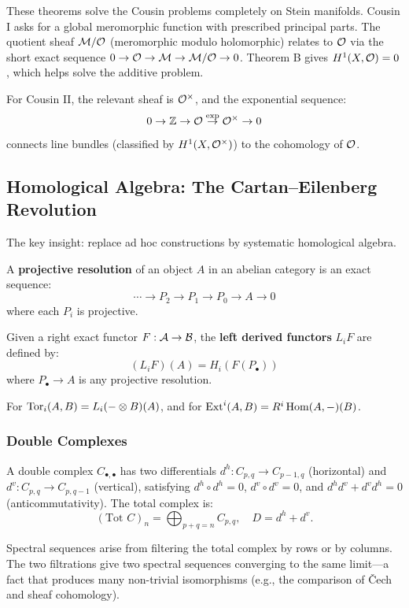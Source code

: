 These theorems solve the Cousin problems completely on Stein manifolds. Cousin I asks for a global meromorphic function with prescribed principal parts. The quotient sheaf $\mathcal{M} / \mathcal{O}$ (meromorphic modulo holomorphic) relates to $\mathcal{O}$ via the short exact sequence $0 \to \mathcal{O} \to \mathcal{M} \to \mathcal{M}/\mathcal{O} \to 0$. Theorem B gives $H^1(X, \mathcal{O}) = 0$, which helps solve the additive problem.

For Cousin II, the relevant sheaf is $\mathcal{O}^\times$, and the exponential sequence:
\[
0 \to \mathbb{Z} \to \mathcal{O} \stackrel{\exp}{\to} \mathcal{O}^\times \to 0
\]
connects line bundles (classified by $H^1(X, \mathcal{O}^\times)$) to the cohomology of $\mathcal{O}$.

\subsection{Homological Algebra: The Cartan--Eilenberg Revolution}

The key insight: replace ad hoc constructions by systematic homological algebra.

\begin{definition}
A \textbf{projective resolution} of an object $A$ in an abelian category is an exact sequence:
\[
\cdots \to P_2 \to P_1 \to P_0 \to A \to 0
\]
where each $P_i$ is projective.
\end{definition}

\begin{definition}
Given a right exact functor $F: \mathcal{A} \to \mathcal{B}$, the \textbf{left derived functors} $L_i F$ are defined by:
\[
(L_i F)(A) = H_i(F(P_\bullet))
\]
where $P_\bullet \to A$ is any projective resolution.
\end{definition}

For $\operatorname{Tor}_i(A,B) = L_i(-\otimes B)(A)$, and for $\operatorname{Ext}^i(A,B) = R^i \operatorname{Hom}(A,-)(B)$.

\subsubsection*{Double Complexes}

A double complex $C_{\bullet,\bullet}$ has two differentials $d^h: C_{p,q} \to C_{p-1,q}$ (horizontal) and $d^v: C_{p,q} \to C_{p,q-1}$ (vertical), satisfying $d^h \circ d^h = 0$, $d^v \circ d^v = 0$, and $d^h d^v + d^v d^h = 0$ (anticommutativity). The total complex is:
\[
(\text{Tot } C)_n = \bigoplus_{p+q=n} C_{p,q}, \quad D = d^h + d^v.
\]

Spectral sequences arise from filtering the total complex by rows or by columns. The two filtrations give two spectral sequences converging to the same limit---a fact that produces many non-trivial isomorphisms (e.g., the comparison of \v{C}ech and sheaf cohomology).

